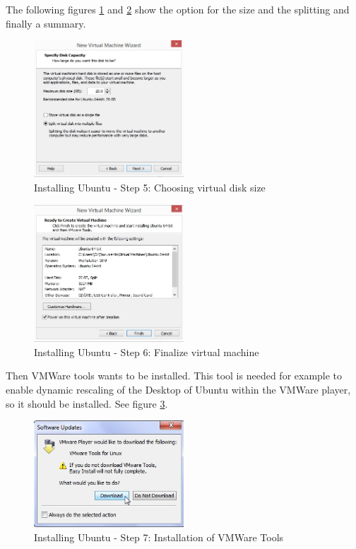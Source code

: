 The following figures \ref{fig:Ub5} and \ref{fig:Ub6} show the option for the size and the splitting and finally a summary.

\begin{figure}[H]
	\centering\includegraphics[width=0.5\textwidth]{fig/Dev_Concept/Ub5.jpg}
	\caption{Installing Ubuntu - Step 5: Choosing virtual disk size}
	\label{fig:Ub5}
\end{figure}

\begin{figure}[H]
	\centering\includegraphics[width=0.5\textwidth]{fig/Dev_Concept/Ub6.jpg}
	\caption{Installing Ubuntu - Step 6: Finalize virtual machine}
	\label{fig:Ub6}
\end{figure}

Then VMWare tools wants to be installed. This tool is needed for example to enable dynamic rescaling of the Desktop of Ubuntu within the VMWare player, so it should be installed. See figure \ref{fig:Ub7}.

\begin{figure}[H]
	\centering\includegraphics[width=0.5\textwidth]{fig/Dev_Concept/Ub7.jpg}
	\caption{Installing Ubuntu - Step 7: Installation of VMWare Tools}
	\label{fig:Ub7}
\end{figure}


